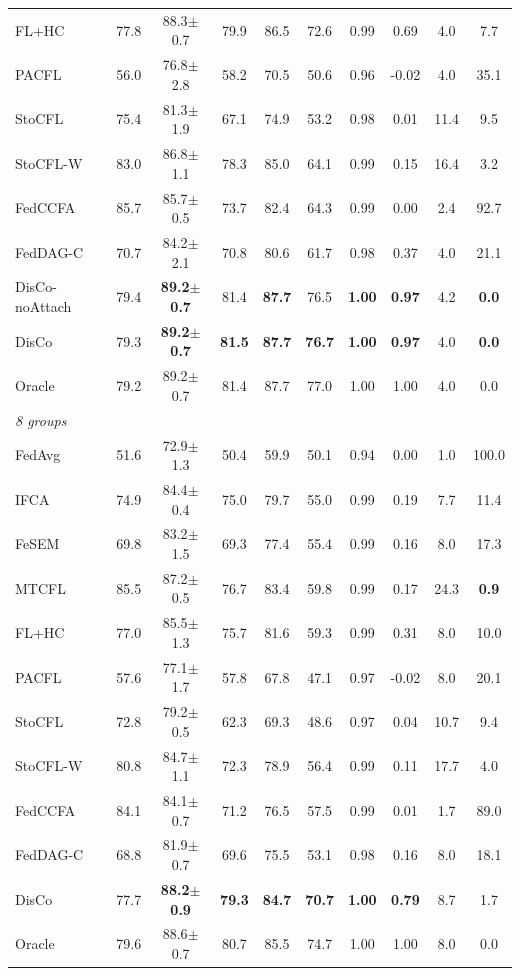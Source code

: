 \begin{tabular}{lccccccccc}
FL+HC & 77.8 & 88.3$\pm$0.7 & 79.9 & 86.5 & 72.6 & 0.99 & 0.69 & 4.0 & 7.7 \\
PACFL & 56.0 & 76.8$\pm$2.8 & 58.2 & 70.5 & 50.6 & 0.96 & -0.02 & 4.0 & 35.1 \\
StoCFL & 75.4 & 81.3$\pm$1.9 & 67.1 & 74.9 & 53.2 & 0.98 & 0.01 & 11.4 & 9.5 \\
StoCFL-W & 83.0 & 86.8$\pm$1.1 & 78.3 & 85.0 & 64.1 & 0.99 & 0.15 & 16.4 & 3.2 \\
FedCCFA & 85.7 & 85.7$\pm$0.5 & 73.7 & 82.4 & 64.3 & 0.99 & 0.00 & 2.4 & 92.7 \\
FedDAG-C & 70.7 & 84.2$\pm$2.1 & 70.8 & 80.6 & 61.7 & 0.98 & 0.37 & 4.0 & 21.1 \\
DisCo-noAttach & 79.4 & \textbf{89.2$\pm$0.7} & 81.4 & \textbf{87.7} & 76.5 & \textbf{1.00} & \textbf{0.97} & 4.2 & \textbf{0.0} \\
DisCo & 79.3 & \textbf{89.2$\pm$0.7} & \textbf{81.5} & \textbf{87.7} & \textbf{76.7} & \textbf{1.00} & \textbf{0.97} & 4.0 & \textbf{0.0} \\
Oracle & 79.2 & 89.2$\pm$0.7 & 81.4 & 87.7 & 77.0 & 1.00 & 1.00 & 4.0 & 0.0 \\
\midrule
\multicolumn{10}{l}{\textit{8 groups}}\\
FedAvg & 51.6 & 72.9$\pm$1.3 & 50.4 & 59.9 & 50.1 & 0.94 & 0.00 & 1.0 & 100.0 \\
IFCA & 74.9 & 84.4$\pm$0.4 & 75.0 & 79.7 & 55.0 & 0.99 & 0.19 & 7.7 & 11.4 \\
FeSEM & 69.8 & 83.2$\pm$1.5 & 69.3 & 77.4 & 55.4 & 0.99 & 0.16 & 8.0 & 17.3 \\
MTCFL & 85.5 & 87.2$\pm$0.5 & 76.7 & 83.4 & 59.8 & 0.99 & 0.17 & 24.3 & \textbf{0.9} \\
FL+HC & 77.0 & 85.5$\pm$1.3 & 75.7 & 81.6 & 59.3 & 0.99 & 0.31 & 8.0 & 10.0 \\
PACFL & 57.6 & 77.1$\pm$1.7 & 57.8 & 67.8 & 47.1 & 0.97 & -0.02 & 8.0 & 20.1 \\
StoCFL & 72.8 & 79.2$\pm$0.5 & 62.3 & 69.3 & 48.6 & 0.97 & 0.04 & 10.7 & 9.4 \\
StoCFL-W & 80.8 & 84.7$\pm$1.1 & 72.3 & 78.9 & 56.4 & 0.99 & 0.11 & 17.7 & 4.0 \\
FedCCFA & 84.1 & 84.1$\pm$0.7 & 71.2 & 76.5 & 57.5 & 0.99 & 0.01 & 1.7 & 89.0 \\
FedDAG-C & 68.8 & 81.9$\pm$0.7 & 69.6 & 75.5 & 53.1 & 0.98 & 0.16 & 8.0 & 18.1 \\
DisCo & 77.7 & \textbf{88.2$\pm$0.9} & \textbf{79.3} & \textbf{84.7} & \textbf{70.7} & \textbf{1.00} & \textbf{0.79} & 8.7 & 1.7 \\
Oracle & 79.6 & 88.6$\pm$0.7 & 80.7 & 85.5 & 74.7 & 1.00 & 1.00 & 8.0 & 0.0 \\
\bottomrule
\end{tabular}
